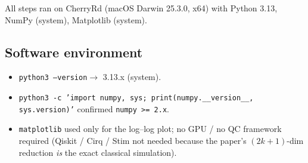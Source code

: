 \documentclass[11pt]{article}
\begin{document}
All steps ran on CherryRd (macOS Darwin 25.3.0, x64) with Python
3.13, NumPy (system), Matplotlib (system).

\subsection{Software environment}
\begin{itemize}[nosep]
  \item \texttt{python3 --version}\hfill $\to$ 3.13.x (system).
  \item \texttt{python3 -c 'import numpy, sys; print(numpy.\_\_version\_\_, sys.version)'}
        confirmed \texttt{numpy >= 2.x}.
  \item \texttt{matplotlib} used only for the log--log plot; no GPU / no QC
        framework required (Qiskit / Cirq / Stim not needed because the
        paper's $(2k+1)$-dim reduction \emph{is} the exact classical
        simulation).
\end{itemize}
\end{document}
